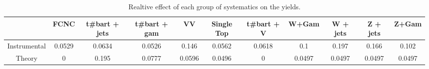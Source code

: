 \begin{table}[htbp]
\begin{center}
\begin{tabular}{|c|c|c|c|c|c|c|c|c|c|c|}
\hline 
      & FCNC      & t#bar{t} + jets      & t#bar{t} +  gam      & VV      & Single Top      & t#bar{t} + V      & W+Gam      & W + jets      & Z + jets      & Z+Gam \\ 
\hline 
 Instrumental & 0.0529 & 0.0634 & 0.0526 & 0.146 & 0.0562 & 0.0618 & 0.1 & 0.197 & 0.166 & 0.102 \\ 
 Theory & 0 & 0.195 & 0.0777 & 0.0596 & 0.0496 & 0 & 0.0497 & 0.0497 & 0.0497 & 0.0497 \\ 
\hline 
\end{tabular} 
\caption{Realtive effect of each group of systematics on the yields.} 
\end{center} 
\end{table} 
